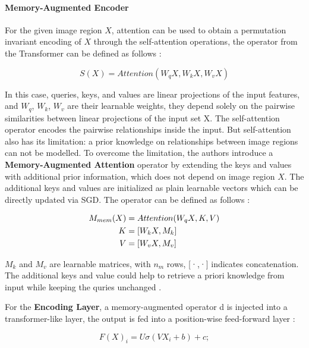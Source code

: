 \documentclass[
]{krantz}
\begin{document}
\hypertarget{memory-augmented-encoder}{%
\paragraph{Memory-Augmented Encoder}\label{memory-augmented-encoder}}

For the given image region \(X\), attention can be used to obtain a permutation invariant encoding of \(X\) through the self-attention operations, the operator from the Transformer can be defined as follows \citep{cornia2020m2}:

\begin{equation}
S(X) = Attention(W_q X, W_k X, W_vX)
\end{equation}

In this case, queries, keys, and values are linear projections of the input features, and \(W_q\), \(W_k\), \(W_v\) are their learnable weights, they depend solely on the pairwise similarities between linear projections of the input set X. The self-attention operator encodes the pairwise relationships inside the input.
But self-attention also has its limitation: a prior knowledge on relationships between image regions can not be modelled.
To overcome the limitation, the authors introduce a \textbf{Memory-Augmented Attention} operator by extending the keys and values with additional prior information, which does not depend on image region \(X\).
The additional keys and values are initialized as plain learnable vectors which can be directly updated via SGD.
The operator can be defined as follows \citep{cornia2020m2}:

\begin{align}
M_{mem}(X) &=  Attention(W_qX, K, V ) \notag \\
K &=  [W_kX, M_k]\notag \\
V &= [W_vX, M_v]
\end{align}

\(M_k\) and \(M_v\) are learnable matrices, with \(n_m\) rows, {[}·,·{]} indicates concatenation. The additional keys and value could help to retrieve a priori knowledge from input while keeping the quries unchanged \citep{cornia2020m2}.

For the \textbf{Encoding Layer}, a memory-augmented operator d is injected into a transformer-like layer, the output is fed into a position-wise feed-forward layer \citep{cornia2020m2}:

\begin{equation}
F(X)_i= U\sigma(V X_i + b) + c;
\end{equation}
\end{document}
